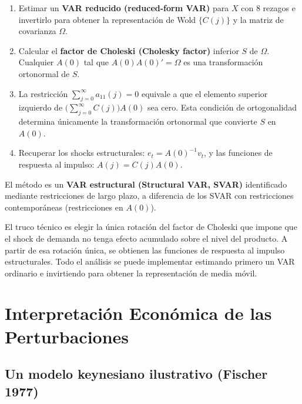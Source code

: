 \documentclass[12pt]{article}
\begin{document}
\begin{enumerate}
  \item Estimar un \textbf{VAR reducido (reduced-form VAR)} para $X$ con 8 rezagos e invertirlo para obtener la representaci\'on de Wold $\{C(j)\}$ y la matriz de covarianza $\Omega$.
  \item Calcular el \textbf{factor de Choleski (Cholesky factor)} inferior $S$ de $\Omega$. Cualquier $A(0)$ tal que $A(0)A(0)' = \Omega$ es una transformaci\'on ortonormal de $S$.
  \item La restricci\'on $\sum_{j=0}^{\infty} a_{11}(j) = 0$ equivale a que el elemento superior izquierdo de $\bigl(\sum_{j=0}^{\infty}C(j)\bigr)A(0)$ sea cero. Esta condici\'on de ortogonalidad determina \'unicamente la transformaci\'on ortonormal que convierte $S$ en $A(0)$.
  \item Recuperar los shocks estructurales: $e_t = A(0)^{-1}v_t$, y las funciones de respuesta al impulso: $A(j) = C(j)A(0)$.
\end{enumerate}

El m\'etodo es un \textbf{VAR estructural (Structural VAR, SVAR)} identificado mediante restricciones de largo plazo, a diferencia de los SVAR con restricciones contempor\'aneas (restricciones en $A(0)$).

\begin{intuicion}
El truco t\'ecnico es elegir la \'unica rotaci\'on del factor de Choleski que impone que el shock de demanda no tenga efecto acumulado sobre el nivel del producto. A partir de esa rotaci\'on \'unica, se obtienen las funciones de respuesta al impulso estructurales. Todo el an\'alisis se puede implementar estimando primero un VAR ordinario e invirtiendo para obtener la representaci\'on de media m\'ovil.
\end{intuicion}

\section{Interpretaci\'on Econ\'omica de las Perturbaciones}

\subsection{Un modelo keynesiano ilustrativo (Fischer 1977)}
\end{document}
